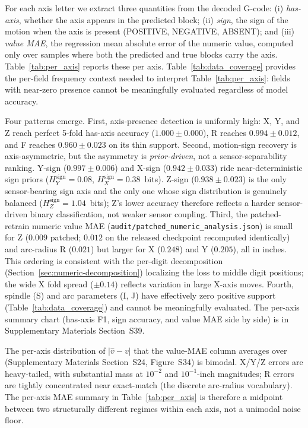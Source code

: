 \documentclass[sensors,article,submit,moreauthors,pdftex]{Definitions/mdpi}
\begin{document}
For each axis letter we extract three quantities from the decoded G-code: (i) \emph{has-axis}, whether the axis appears in the predicted block; (ii) \emph{sign}, the sign of the motion when the axis is present (POSITIVE, NEGATIVE, ABSENT); and (iii) \emph{value MAE}, the regression mean absolute error of the numeric value, computed only over samples where both the predicted and true blocks carry the axis. Table~\ref{tab:per_axis} reports these per axis. Table~\ref{tab:data_coverage} provides the per-field frequency context needed to interpret Table~\ref{tab:per_axis}: fields with near-zero presence cannot be meaningfully evaluated regardless of model accuracy.





Four patterns emerge. First, axis-presence detection is uniformly high: X, Y, and Z reach perfect 5-fold has-axis accuracy ($1.000 \pm 0.000$), R reaches $0.994 \pm 0.012$, and F reaches $0.960 \pm 0.023$ on its thin support. Second, motion-sign recovery is axis-asymmetric, but the asymmetry is \emph{prior-driven}, not a sensor-separability ranking. Y-sign ($0.997 \pm 0.006$) and X-sign ($0.942 \pm 0.033$) ride near-deterministic sign priors ($H_{Y}^{\text{sign}}\!=\!0.08$, $H_{X}^{\text{sign}}\!=\!0.38$~bits). Z-sign ($0.938 \pm 0.023$) is the only sensor-bearing sign axis and the only one whose sign distribution is genuinely balanced ($H_{Z}^{\text{sign}}\!=\!1.04$~bits); Z's lower accuracy therefore reflects a harder sensor-driven binary classification, not weaker sensor coupling. Third, the patched-retrain numeric value MAE (\texttt{audit/patched\_numeric\_analysis.json}) is small for Z ($0.009$ patched; $0.012$ on the released checkpoint recomputed identically) and arc-radius R ($0.021$) but larger for X ($0.248$) and Y ($0.205$), all in inches. This ordering is consistent with the per-digit decomposition (Section~\ref{sec:numeric-decomposition}) localizing the loss to middle digit positions; the wide X fold spread ($\pm 0.14$) reflects variation in large X-axis moves. Fourth, spindle (S) and arc parameters (I, J) have effectively zero positive support (Table~\ref{tab:data_coverage}) and cannot be meaningfully evaluated. The per-axis summary chart (has-axis F1, sign accuracy, and value MAE side by side) is in Supplementary Materials Section~S39.

The per-axis distribution of $|\hat{v}-v|$ that the value-MAE column averages over (Supplementary Materials Section~S24, Figure~S34) is bimodal. X/Y/Z errors are heavy-tailed, with substantial mass at $10^{-2}$ and $10^{-1}$-inch magnitudes; R errors are tightly concentrated near exact-match (the discrete arc-radius vocabulary). The per-axis MAE summary in Table~\ref{tab:per_axis} is therefore a midpoint between two structurally different regimes within each axis, not a unimodal noise floor.
\end{document}
